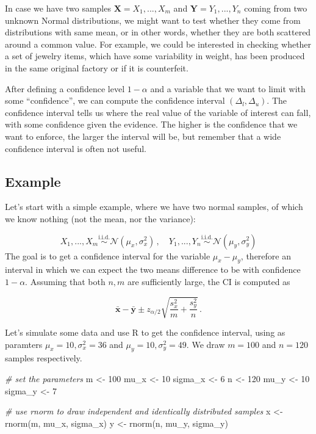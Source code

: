 \documentclass[
  oneside]{book}
\newenvironment{Shaded}{\begin{snugshade}}{\end{snugshade}}
\newcommand{\CommentTok}[1]{\textcolor[rgb]{0.56,0.35,0.01}{\textit{#1}}}
\newcommand{\DecValTok}[1]{\textcolor[rgb]{0.00,0.00,0.81}{#1}}
\newcommand{\FunctionTok}[1]{\textcolor[rgb]{0.00,0.00,0.00}{#1}}
\newcommand{\NormalTok}[1]{#1}
\newcommand{\OtherTok}[1]{\textcolor[rgb]{0.56,0.35,0.01}{#1}}
\begin{document}
In case we have two samples \(\mathbf{X} = X_1, ..., X_m\) and
\(\mathbf{Y} = Y_1, ..., Y_n\) coming from two unknown Normal distributions, we
might want to test whether they come from distributions with same mean, or in
other words, whether they are both scattered around a common value. For example,
we could be interested in checking whether a set of jewelry items, which have
some variability in weight, has been produced in the same original
factory or if it is counterfeit.

After defining a confidence level \(1-\alpha\) and a variable that
we want to limit with some ``confidence'', we can compute the confidence interval
\((\Delta_l, \Delta_u)\). The confidence interval tells us where the
real value of the variable of interest can fall, with some
confidence given the evidence.
The higher is the confidence that we want to enforce, the larger the interval
will be, but remember that a wide confidence interval is often not useful.

\hypertarget{example-1}{%
\subsection{Example}\label{example-1}}

Let's start with a simple example, where we have two normal samples,
of which we know nothing (not the mean, nor the variance):

\[
X_1, ..., X_m \stackrel{\text{i.i.d.}}{\sim} \mathcal N (\mu_x, \sigma_x^2)\,,\quad
Y_1, ..., Y_n \stackrel{\text{i.i.d.}}{\sim} \mathcal N (\mu_y, \sigma_y^2)
\]
The goal is to get a confidence interval for the variable \(\mu_x - \mu_y\),
therefore an interval in which we can expect the two means difference to be
with confidence \(1 - \alpha\).
Assuming that both \(n, m\) are sufficiently
large, the CI is computed as

\[
\bar{\mathbf{x}} - \bar{\mathbf{y}} \pm z_{\alpha/2}\sqrt{\frac{s_x^2}{m} +
\frac{s_y^2}{n}}\,.
\]

Let's simulate some data and use R to get the confidence interval, using as
paramters \(\mu_x = 10, \sigma_x^2 = 36\) and \(\mu_y = 10, \sigma_y^2 = 49\). We
draw \(m = 100\) and \(n = 120\) samples respectively.

\begin{Shaded}
\begin{Highlighting}[]
\CommentTok{\# set the parameters}
\NormalTok{m }\OtherTok{\textless{}{-}} \DecValTok{100}
\NormalTok{mu\_x }\OtherTok{\textless{}{-}} \DecValTok{10}
\NormalTok{sigma\_x }\OtherTok{\textless{}{-}} \DecValTok{6}
\NormalTok{n }\OtherTok{\textless{}{-}} \DecValTok{120}
\NormalTok{mu\_y }\OtherTok{\textless{}{-}} \DecValTok{10}
\NormalTok{sigma\_y }\OtherTok{\textless{}{-}} \DecValTok{7}

\CommentTok{\# use rnorm to draw independent and identically distributed samples}
\NormalTok{x }\OtherTok{\textless{}{-}} \FunctionTok{rnorm}\NormalTok{(m, mu\_x, sigma\_x)}
\NormalTok{y }\OtherTok{\textless{}{-}} \FunctionTok{rnorm}\NormalTok{(n, mu\_y, sigma\_y)}
\end{Highlighting}
\end{Shaded}
\end{document}
